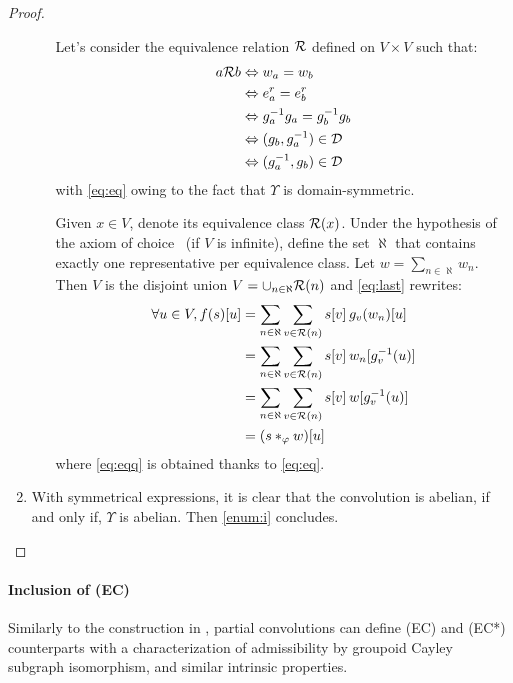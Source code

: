 \begin{proof}
\begin{enumerate}[label=(\roman*)]
\begin{enumerate}
    Let's consider the equivalence relation $\ccr$ defined on $V \times V$ such that:
    \begin{align}
    a \ccr b & \Leftrightarrow    w_a = w_b\nonumber\\
            & \Leftrightarrow e^r_a = e^r_b\nonumber\\
            & \Leftrightarrow g_a^{-1}g_a = g_b^{-1}g_b\nonumber\\
            & \Leftrightarrow (g_b, g_a^{-1}) \in \cd\nonumber\\
            & \Leftrightarrow (g_a^{-1}, g_b) \in \cd \label{eq:eq}
    \end{align}
    with \eqref{eq:eq} owing to the fact that $\Upsilon$ is domain-symmetric.

    Given $x\in V$, denote its equivalence class $\ccr(x)$. Under the hypothesis of the axiom of choice~\citep{zermelo1904beweis} (if $V$ is infinite), define the set $\aleph$ that contains exactly one representative per equivalence class. Let $w = \sum_{n \in \aleph} w_n$. Then $V$ is the disjoint union $V = \displaystyle\cup_{n \in \aleph} \ccr(n)$ and \eqref{eq:last} rewrites:
    \begin{align}
    \forall u \in V, f(s)[u] & = \displaystyle\sum_{n \in \aleph}\sum_{v \in \ccr(n)} s[v] \h{2} g_v(w_n)[u]\nonumber\\
    	 				  & = \displaystyle\sum_{n \in \aleph}\sum_{v \in \ccr(n)} s[v] \h{2} w_n[g_v^{-1}(u)]\nonumber\\
    	 				  & = \displaystyle\sum_{n \in \aleph}\sum_{v \in \ccr(n)} s[v] \h{2} w[g_v^{-1}(u)]\label{eq:eqq}\\
    	 				  & = (s \ast_\varphi w)[u]\nonumber
    \end{align}
    where \eqref{eq:eqq} is obtained thanks to \eqref{eq:eq}.
  \end{enumerate}

  \item With symmetrical expressions, it is clear that the convolution is abelian, if and only if, $\Upsilon$ is abelian. Then \ref{enum:i} concludes.
\end{enumerate}
\end{proof}

\paragraph{Inclusion of (EC)}
Similarly to the construction in , partial convolutions can define (EC) and (EC*) counterparts with a characterization of admissibility by groupoid Cayley subgraph isomorphism, and similar intrinsic properties.


